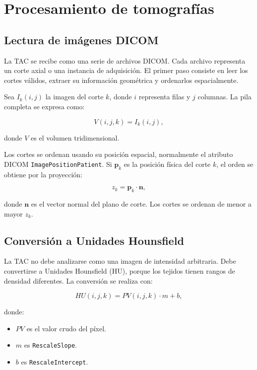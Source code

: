\documentclass[12pt,a4paper]{article}
\begin{document}
\section{Procesamiento de tomografías}

\subsection{Lectura de imágenes DICOM}

La TAC se recibe como una serie de archivos DICOM. Cada archivo representa un corte axial o una instancia de adquisición. El primer paso consiste en leer los cortes válidos, extraer su información geométrica y ordenarlos espacialmente.

Sea \(I_k(i,j)\) la imagen del corte \(k\), donde \(i\) representa filas y \(j\) columnas. La pila completa se expresa como:

\[
V(i,j,k) = I_k(i,j),
\]

donde \(V\) es el volumen tridimensional.

Los cortes se ordenan usando su posición espacial, normalmente el atributo DICOM \texttt{ImagePositionPatient}. Si \(\mathbf{p}_k\) es la posición física del corte \(k\), el orden se obtiene por la proyección:

\[
z_k = \mathbf{p}_k \cdot \mathbf{n},
\]

donde \(\mathbf{n}\) es el vector normal del plano de corte. Los cortes se ordenan de menor a mayor \(z_k\).

\subsection{Conversión a Unidades Hounsfield}

La TAC no debe analizarse como una imagen de intensidad arbitraria. Debe convertirse a Unidades Hounsfield (HU), porque los tejidos tienen rangos de densidad diferentes. La conversión se realiza con:

\[
HU(i,j,k)=PV(i,j,k)\cdot m + b,
\]

donde:

\begin{itemize}
    \item \(PV\) es el valor crudo del píxel.
    \item \(m\) es \texttt{RescaleSlope}.
    \item \(b\) es \texttt{RescaleIntercept}.
\end{itemize}
\end{document}
